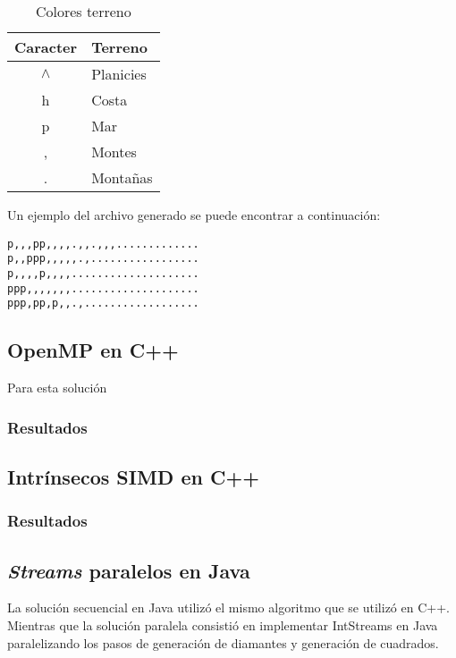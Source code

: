 \documentclass[10pt,letterpaper,oneside]{article}
\begin{document}
\begin{table}[H]
	\centering
	\begin{tabular}{|c|l|}
		\hline
			Caracter & Terreno		\\
		\hline
			$\wedge$& Planicies 		\\
			h		& Costa			\\
			p		& Mar			\\
			,		& Montes			\\
			. 		& Montañas		\\
		\hline
	\end{tabular}
	\caption{Colores terreno}
	\label{tab:maptext}
\end{table}

\pagebreak

Un ejemplo del archivo generado se puede encontrar a continuación:

\begin{verbatim}
p,,,pp,,,,.,,.,,,.............
p,,ppp,,,,,.,.................
p,,,,p,,,,....................
ppp,,,,,,,....................
ppp,pp,p,,.,..................
\end{verbatim}

\subsection{OpenMP en C++}

Para esta solución 

\subsubsection{Resultados}

\subsection{Intrínsecos SIMD en C++}

\subsubsection{Resultados}

\subsection{\textit{Streams} paralelos en Java}

La solución secuencial en Java utilizó el mismo algoritmo que se utilizó en C++. Mientras que la solución paralela consistió en implementar IntStreams en Java paralelizando los pasos de generación de diamantes y generación de cuadrados. 
\end{document}
